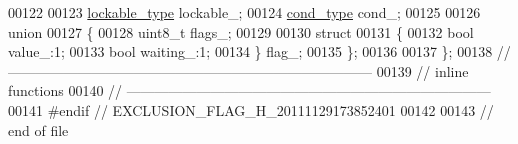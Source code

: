 \begin{DoxyCode}
00122 
00123     \hyperlink{classhryky_1_1exclusion_1_1_mutex}{lockable_type}   lockable\_;
00124     \hyperlink{classhryky_1_1exclusion_1_1_cond}{cond_type}       cond\_;
00125 
00126     \textcolor{keyword}{union}
00127     \{
00128         uint8\_t     flags\_;
00129 
00130         \textcolor{keyword}{struct}
00131         \{
00132             \textcolor{keywordtype}{bool}    value\_:1;
00133             \textcolor{keywordtype}{bool}    waiting\_:1;
00134         \} flag\_;
00135     \};
00136 
00137 \};
00138 \textcolor{comment}{//
      ------------------------------------------------------------------------------}
00139 \textcolor{comment}{// inline functions}
00140 \textcolor{comment}{//
      ------------------------------------------------------------------------------}
00141 \textcolor{preprocessor}{#endif // EXCLUSION\_FLAG\_H\_20111129173852401}
00142 \textcolor{preprocessor}{}
00143 \textcolor{comment}{// end of file}
\end{DoxyCode}
